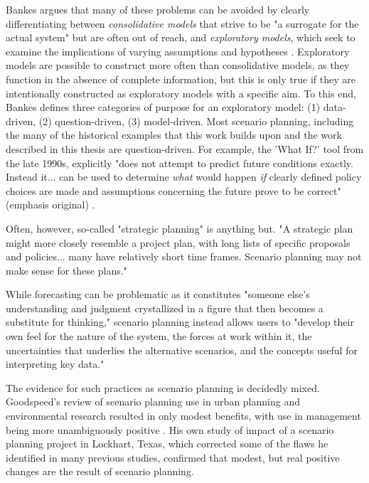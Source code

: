 Bankes argues that many of these problems can be avoided by clearly differentiating between \textit{consolidative models} that strive to be "a surrogate for the actual system" but are often out of reach, and \textit{exploratory models}, which seek to examine the implications of varying assumptions and hypotheses \cite{bankesExploratoryModelingPolicy1993}. Exploratory models are possible to construct more often than consolidative models, as they function in the absence of complete information, but this is only true if they are intentionally constructed as exploratory models with a specific aim.  To this end, Bankes defines three categories of purpose for an exploratory model: (1) data-driven, (2) question-driven, (3) model-driven. Most scenario planning, including the many of the historical examples that this work builds upon and the work described in this thesis are question-driven. For example, the 'What If?' tool from the late 1990s, explicitly "does not attempt to predict future conditions exactly. Instead it... can be used to determine \textit{what} would happen \textit{if} clearly defined policy choices are made and assumptions concerning the future prove to be correct" (emphasis original) \cite{klostermanWhatIfCollaborative1999}.


Often, however, so-called "strategic planning" is anything but. "A strategic plan might more closely resemble a project plan, with long lists of specific proposals and policies... many have relatively short time frames. Scenario planning may not make sense for these plans." \cite{goodspeedScenarioPlanningCities2020}



While forecasting can be problematic as it constitutes "someone else's understanding and judgment crystallized in a figure that then becomes a substitute for thinking," scenario planning instead allows users to "develop their own feel for the nature of the system, the forces at work within it, the uncertainties that underlies the alternative scenarios, and the concepts useful for interpreting key data." \cite{wackScenariosShootingRapids1985}

The evidence for such practices as scenario planning is decidedly mixed. Goodspeed's review of scenario planning use in urban planning and environmental research resulted in only modest benefits, with use in management being more unambiguously positive \cite{goodspeedScenarioPlanningCities2020}. His own study of impact of a scenario planning project in Lockhart, Texas, which corrected some of the flaws he identified in many previous studies, confirmed that modest, but real positive changes are the result of scenario planning.

